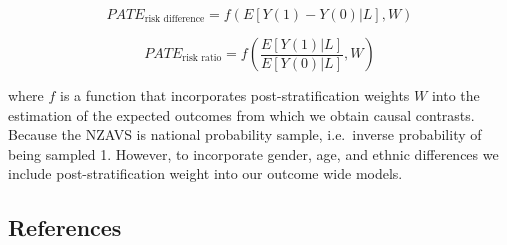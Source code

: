 \documentclass[
  singlecolumn]{article}
\begin{document}
\[PATE_{\text{risk difference}} = f(E[Y(1) - Y(0)|L], W)\]

\[PATE_{\text{risk ratio}} = f\left(\frac{E[Y(1)|L]}{E[Y(0)|L]}, W\right)\]

where \(f\) is a function that incorporates post-stratification weights
\(W\) into the estimation of the expected outcomes from which we obtain
causal contrasts. Because the NZAVS is national probability sample,
i.e.~inverse probability of being sampled 1. However, to incorporate
gender, age, and ethnic differences we include post-stratification
weight into our outcome wide models.

\newpage{}

\subsection*{References}\label{references}
\end{document}

